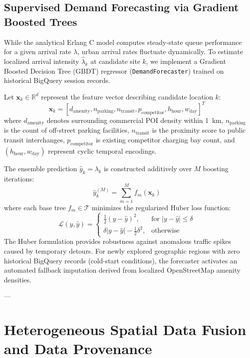 \documentclass[preprint,12pt,authoryear]{elsarticle}
\begin{document}
\subsection{Supervised Demand Forecasting via Gradient Boosted Trees}
While the analytical Erlang C model computes steady-state queue performance for a given arrival rate $\lambda$, urban arrival rates fluctuate dynamically. To estimate localized arrival intensity $\hat{\lambda}_k$ at candidate site $k$, we implement a Gradient Boosted Decision Tree (GBDT) regressor (\texttt{DemandForecaster}) trained on historical BigQuery session records.

Let $\mathbf{x}_k \in \mathbb{R}^d$ represent the feature vector describing candidate location $k$:
\begin{equation}
\mathbf{x}_k = [d_{\text{amenity}}, n_{\text{parking}}, n_{\text{transit}}, p_{\text{competitor}}, h_{\text{hour}}, w_{\text{day}}]^T
\end{equation}
where $d_{\text{amenity}}$ denotes surrounding commercial POI density within 1~km, $n_{\text{parking}}$ is the count of off-street parking facilities, $n_{\text{transit}}$ is the proximity score to public transit interchanges, $p_{\text{competitor}}$ is existing competitor charging bay count, and $(h_{\text{hour}}, w_{\text{day}})$ represent cyclic temporal encodings.

The ensemble prediction $\hat{y}_k = \hat{\lambda}_k$ is constructed additively over $M$ boosting iterations:
\begin{equation}
\hat{y}_k^{(M)} = \sum_{m=1}^M f_m(\mathbf{x}_k)
\end{equation}
where each base tree $f_m \in \mathcal{T}$ minimizes the regularized Huber loss function:
\begin{equation}
\mathcal{L}(y, \hat{y}) = 
\begin{cases} 
\frac{1}{2}(y - \hat{y})^2, & \text{for } |y - \hat{y}| \le \delta \\ 
\delta |y - \hat{y}| - \frac{1}{2}\delta^2, & \text{otherwise} 
\end{cases}
\end{equation}
The Huber formulation provides robustness against anomalous traffic spikes caused by temporary detours. For newly explored geographic regions with zero historical BigQuery records (cold-start conditions), the forecaster activates an automated fallback imputation derived from localized OpenStreetMap amenity densities.

---

\section{Heterogeneous Spatial Data Fusion and Data Provenance}
\label{sec:data_fusion}
\end{document}
